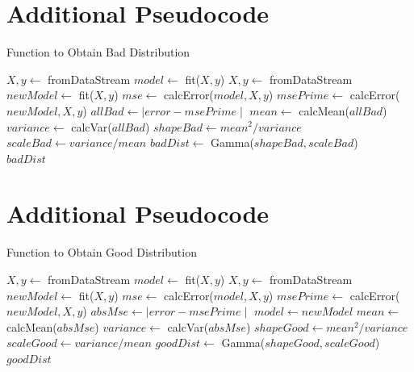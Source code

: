 \documentclass{mpaper}
\begin{document}
\begin{appendix}
\section{Additional Pseudocode}\label{baddist}
\begin{algorithm}[h]
\caption{Function to Obtain Bad Distribution}
\begin{algorithmic}
    \State $X, y \gets$ fromDataStream
    \State $model \gets$ fit($X,y$)
        \State $X, y \gets$ fromDataStream
        \State $newModel \gets$ fit($X,y$)
        \State $mse \gets$ calcError($model,X,y$)
        \State $msePrime \gets$ calcError($newModel,X,y$)
        \State $allBad \gets \mid error - msePrime \mid$
    \EndFor
    \State $mean \gets$ calcMean($allBad$)
    \State $variance \gets$ calcVar($allBad$)
    \State $shapeBad \gets mean^2/variance$
    \State $scaleBad \gets variance/mean$
    \State $badDist \gets$ Gamma($shapeBad, scaleBad$)\\
    \Return $badDist$
\EndFunction
\end{algorithmic}
\end{algorithm}

\section{Additional Pseudocode}\label{gooddist}
\begin{algorithm}[h]
\caption{Function to Obtain Good Distribution}
\begin{algorithmic}
    \State $X, y \gets$ fromDataStream
    \State $model \gets$ fit($X,y$)
        \State $X, y \gets$ fromDataStream
        \State $newModel \gets$ fit($X,y$)
        \State $mse \gets$ calcError($model,X,y$)
        \State $msePrime \gets$ calcError($newModel,X,y$)
        \State $absMse \gets \mid error - msePrime \mid$
        \State $model \gets newModel$
    \EndFor
    \State $mean \gets$ calcMean($absMse$)
    \State $variance \gets$ calcVar($absMse$)
    \State $shapeGood \gets mean^2/variance$
    \State $scaleGood \gets variance/mean$
    \State $goodDist \gets$ Gamma($shapeGood, scaleGood$)\\
    \Return $goodDist$
\EndFunction
\end{algorithmic}
\end{algorithm}

\end{appendix}
\end{document}

